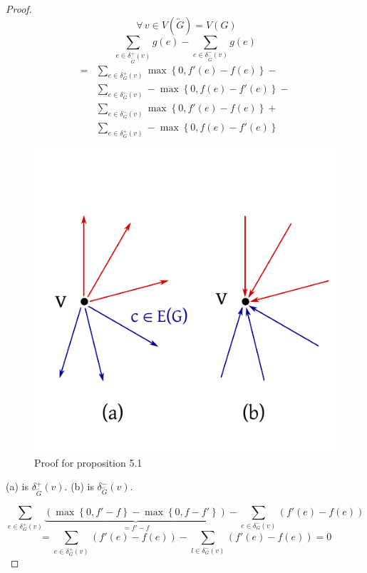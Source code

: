 \documentclass[a4paper]{article}
\theoremstyle{definition}
\newcommand{\set}[1]{\left\{#1\right\}}
\newcommand{\fall}{\;\forall\,}
\begin{document}
\begin{proof}
  \[ \fall v \in V(\overleftrightarrow{G}) = V(G) \]
  \begin{equation*}
    \sum_{e \in \delta^+_{\overleftrightarrow{G}}(v)} g(e) - \sum_{e \in \delta^-_{\overleftrightarrow{G}}(v)} g(e)
  \end{equation*} \begin{align*}
    = &\sum_{e \in \delta^+_{G}(v)} \max\set{0, f'(e) - f(e)} - \\
      &\sum_{e \in \delta^-_G(v)} -\max\set{0, f(e) - f'(e)} - \\
      &\sum_{e \in \delta^-_G(v)} \max\set{0, f'(e) - f(e)} + \\
      &\sum_{e \in \delta^+_G(v)} -\max\set{0, f(e) - f'(e)}
  \end{align*}

  \begin{figure}[ht]
   \begin{center}
    \includegraphics{img/proposition_5_1_proof.pdf}
    \caption{Proof for proposition 5.1}
   \end{center}
  \end{figure}

  (a) is $\delta^+_{\overleftrightarrow{G}}(v)$. (b) is $\delta^-_{\overleftrightarrow{G}}(v)$.

  \[
    \sum_{e \in \delta^+_G(v)} \underbrace{\left(\max\set{0, f' - f} - \max\set{0, f - f'}\right)}_{= f' - f} - \sum_{e \in \delta^-_G(v)} \left(f'(e) - f(e)\right)
  \] \[
      = \sum_{e \in \delta^+_G(v)} \left(f'(e) - f(e)\right) - \sum_{l \in \delta^-_G(v)} \left(f'(e) - f(e)\right)
      = 0
  \]


\end{proof}
\end{document}
